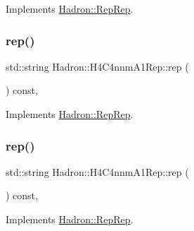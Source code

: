 Implements \mbox{\hyperlink{structHadron_1_1RepRep_ab3213025f6de249f7095892109575fde}{Hadron\+::\+Rep\+Rep}}.

\mbox{\label{structHadron_1_1H4C4nnmA1Rep_a1284b0ca578df221e5280750522ab4b2}} 
\subsubsection{\texorpdfstring{rep()}{rep()}\hspace{0.1cm}{\footnotesize\ttfamily [2/5]}}
{\footnotesize\ttfamily std\+::string Hadron\+::\+H4\+C4nnm\+A1\+Rep\+::rep (\begin{DoxyParamCaption}{ }\end{DoxyParamCaption}) const\hspace{0.3cm}{\ttfamily [inline]}, {\ttfamily [virtual]}}



Implements \mbox{\hyperlink{structHadron_1_1RepRep_ab3213025f6de249f7095892109575fde}{Hadron\+::\+Rep\+Rep}}.

\mbox{\label{structHadron_1_1H4C4nnmA1Rep_a1284b0ca578df221e5280750522ab4b2}} 
\subsubsection{\texorpdfstring{rep()}{rep()}\hspace{0.1cm}{\footnotesize\ttfamily [3/5]}}
{\footnotesize\ttfamily std\+::string Hadron\+::\+H4\+C4nnm\+A1\+Rep\+::rep (\begin{DoxyParamCaption}{ }\end{DoxyParamCaption}) const\hspace{0.3cm}{\ttfamily [inline]}, {\ttfamily [virtual]}}



Implements \mbox{\hyperlink{structHadron_1_1RepRep_ab3213025f6de249f7095892109575fde}{Hadron\+::\+Rep\+Rep}}.

\mbox{\label{structHadron_1_1H4C4nnmA1Rep_a1284b0ca578df221e5280750522ab4b2}} 
